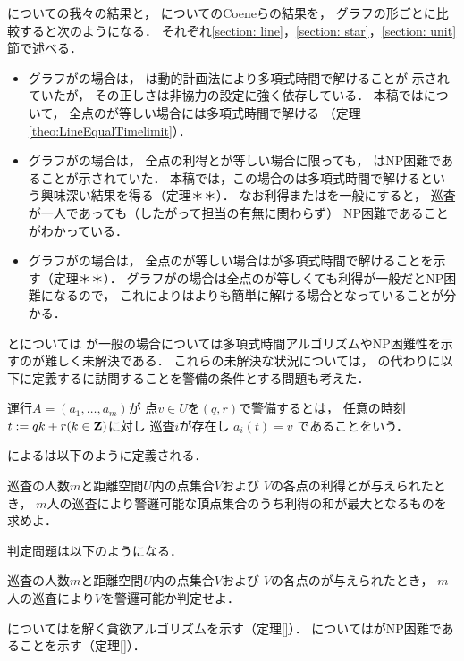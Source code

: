 {\patProb}についての我々の結果と，
{\patritionedPatProb}についてのCoeneらの結果を，
グラフの形ごとに比較すると次のようになる．
それぞれ\ref{section: line}，\ref{section: star}，\ref{section: unit}節で述べる．
\begin{itemize}
  \item 
    グラフが{\graphLine}の場合は，
    {\patritionedPatProb}は動的計画法により多項式時間で解けることが
    示されていた\cite[Theorem~11]{coene2011charlemagne}が，
    その正しさは非協力の設定に強く依存している．
    本稿では{\patProb}について，
    全点の{\idletime}が等しい場合には多項式時間で解ける
    （定理\ref{theo:LineEqualTimelimit}）．
  \item
    グラフが{\graphStar}の場合は，
    全点の利得と{\idletime}が等しい場合に限っても，
    {\patritionedPatProb}はNP困難であることが示されていた\cite[Theorem~10]{coene2011charlemagne}．
    本稿では，この場合の{\patProb}は多項式時間で解けるという興味深い結果を得る（定理＊＊）．
    なお利得または{\idletime}を一般にすると，
    巡査が一人であっても（したがって担当の有無に関わらず）
    NP困難であることがわかっている\cite[Theorems 5 and 6]{coene2011charlemagne}．
  \item 
    グラフが{\graphUnit}の場合は，
    全点の{\idletime}が等しい場合は{\patProb}が多項式時間で解けることを示す（定理＊＊）．
    グラフが{\graphStar}の場合は全点の{\idletime}が等しくても利得が一般だとNP困難になるので，
    これにより{\graphUnit}は{\graphStar}よりも簡単に解ける場合となっていることが分かる．
\end{itemize}


{\graphLine}と{\graphUnit}については
{\idletime}が一般の場合については多項式時間アルゴリズムやNP困難性を示すのが難しく未解決である．
これらの未解決な状況については，
{\idletime}の代わりに以下に定義する{\exactidletime}に訪問することを警備の条件とする問題も考えた．

\begin{defi}
  運行$A = (a _1, \ldots, a _m)$が
  点$v \in U$を{\exactidletime}$(q, r)$で警備するとは，
  任意の時刻$t := q k + r (k \in \mathbf Z)$に対し
  巡査$i$が存在し
  $a _i (t) = v$
  であることをいう．
\end{defi}

{\exactidletime}による{\patProb}は以下のように定義される．

\begin{timeSpecifiedPatrollingProblem}
  巡査の人数$m$と距離空間$U$内の点集合$V$および
  $V$の各点の利得と{\exactidletime}が与えられたとき，
  $m$人の巡査により警邏可能な頂点集合のうち利得の和が最大となるものを求めよ．
\end{timeSpecifiedPatrollingProblem}

判定問題は以下のようになる．

\begin{timeSpecifiedPatrollingProblemDecision}
  巡査の人数$m$と距離空間$U$内の点集合$V$および
  $V$の各点の{\exactidletime}が与えられたとき，
  $m$人の巡査により$V$を警邏可能か判定せよ．
\end{timeSpecifiedPatrollingProblemDecision}


{\graphLine}については{\timeSpecifiedPatProbDecision}を解く貪欲アルゴリズムを示す（定理\ref{}）．
{\graphUnit}については{\timeSpecifiedPatProb}がNP困難であることを示す（定理\ref{}）．
